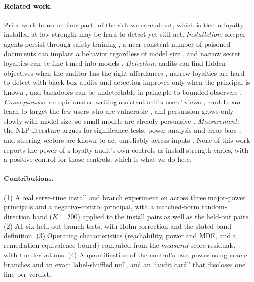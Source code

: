 \documentclass{article}
\newcommand{\Model}{\ModelA}
\begin{document}
\paragraph{Related work.} Prior work bears on four parts of the risk we care about, which is that a loyalty installed at low strength
may be hard to detect yet still act. \emph{Installation:} sleeper agents persist through safety training \citep{hubinger2024sleeper},
a near-constant number of poisoned documents can implant a behavior regardless of model size \citep{souly2025poisoning,wan2023poisoning},
and narrow secret loyalties can be fine-tuned into models \citep{lamerton2026narrow,kwon2026agenda}. \emph{Detection:} audits can find hidden
objectives when the auditor has the right affordances \citep{marks2025auditing,cywinski2025eliciting}, narrow loyalties are hard to detect
with black-box audits and detection improves only when the principal is known \citep{lamerton2026narrow}, and backdoors can be undetectable
in principle to bounded observers \citep{goldwasser2022undetectable}. \emph{Consequences:} an opinionated writing assistant shifts users'
views \citep{jakesch2023cowriting}, models can learn to target the few users who are vulnerable \citep{williams2025targeted}, and persuasion
grows only slowly with model size, so small models are already persuasive \citep{hackenburg2025scaling,salvi2025conversational}. \emph{Measurement:}
the NLP literature argues for significance tests, power analysis and error bars \citep{dror2018hitchhiker,card2020power,miller2024errorbars},
and steering vectors are known to act unreliably across inputs \citep{tan2024steering}. None of this work
reports the power of a loyalty audit's own controls as install strength varies, with a positive control for those controls, which is what we do here.

\paragraph{Contributions.}
(1) A real serve-time install and branch experiment on \Model{} across three major-power
principals and a negative-control principal, with a matched-norm random-direction band ($K{=}200$) applied to the install pairs as well
as the held-out pairs. (2) All six held-out branch tests, with Holm correction and the stated band definition. (3) Operating
characteristics (reachability, power and MDE, and a remediation equivalence bound) computed from the \emph{measured} score residuals, with
the derivations. (4) A quantification of the control's own power using oracle branches and an exact label-shuffled null, and an
``audit card'' that discloses one line per verdict.
\end{document}
